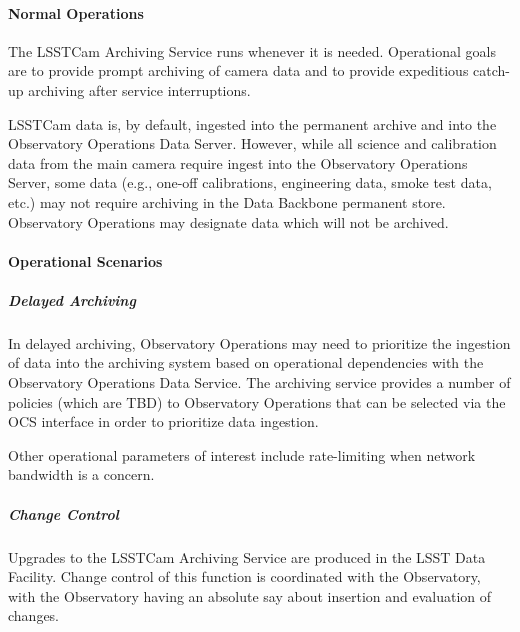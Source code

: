 \paragraph{Normal Operations}

The LSSTCam Archiving Service runs whenever it is needed. Operational goals are
to provide prompt archiving of camera data and to provide expeditious
catch-up archiving after service interruptions.

LSSTCam data is, by default, ingested into the permanent archive
and into the Observatory Operations Data Server. However, while all
science and calibration data from the main camera require ingest into
the Observatory Operations Server, some data (e.g., one-off
calibrations, engineering data, smoke test data, etc.) may not require
archiving in the Data Backbone permanent store. Observatory Operations may
designate data which will not be archived.

\paragraph{Operational Scenarios}

\subparagraph{Delayed Archiving}

In delayed archiving, Observatory Operations may need to prioritize
the ingestion of data into the archiving system based on operational
dependencies with the Observatory Operations Data Service. The
archiving service provides a number of policies (which are TBD) to
Observatory Operations that can be selected via the OCS interface in order to
prioritize data ingestion.

Other operational parameters of interest include rate-limiting when network
bandwidth is a concern.

\subparagraph{Change Control}

Upgrades to the LSSTCam Archiving Service are produced in the LSST Data Facility.
Change control of this function is coordinated with the Observatory, with the
Observatory having an absolute say about insertion and evaluation of changes.
